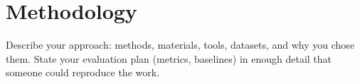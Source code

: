 \chapter{Methodology}
\label{ch:methodology}

Describe your approach: methods, materials, tools, datasets, and why you chose
them. State your evaluation plan (metrics, baselines) in enough detail that
someone could reproduce the work.
